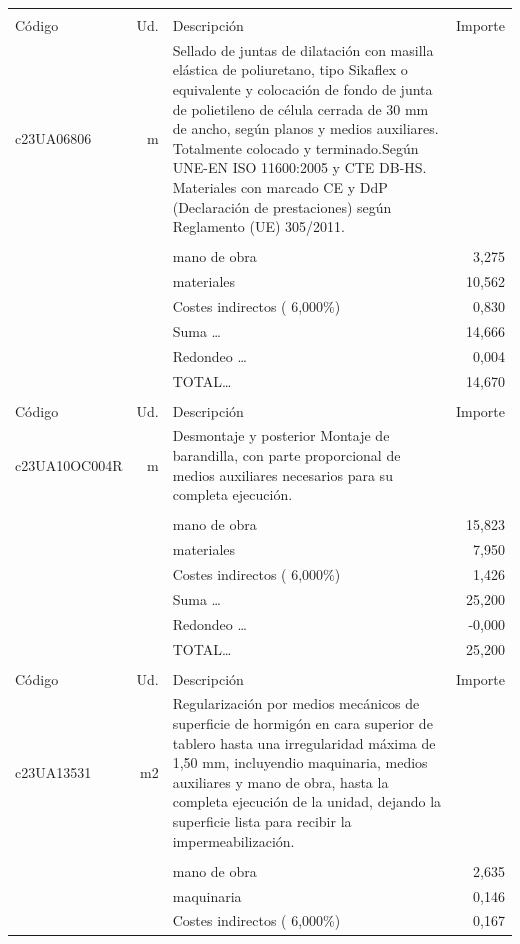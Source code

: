\begin{supertabular}{l r p{60mm} r}
&&&\\%
Código&Ud.&Descripción&Importe\\%
\hline%
c23UA06806&m&Sellado de juntas de dilatación con masilla elástica de poliuretano, tipo Sikaflex o equivalente y colocación de fondo de junta de polietileno de célula cerrada de 30 mm de ancho, según planos y medios auxiliares. Totalmente colocado y terminado.Según UNE{-}EN ISO 11600:2005 y CTE DB{-}HS. Materiales con marcado CE y DdP (Declaración de prestaciones) según Reglamento (UE) 305/2011.&\\%
&&&\\%
&&mano de obra&     3,275\\%
&&materiales&    10,562\\%
&&Costes indirectos (     6,000\%)&     0,830\\%
&&Suma \ldots&    14,666\\%
&&Redondeo \ldots&     0,004\\%
%
&&TOTAL\ldots&    14,670\\%
&&&\\%
Código&Ud.&Descripción&Importe\\%
\hline%
c23UA10OC004R&m&Desmontaje y posterior Montaje de barandilla, con parte proporcional de medios auxiliares necesarios para su completa ejecución.&\\%
&&&\\%
&&mano de obra&    15,823\\%
&&materiales&     7,950\\%
&&Costes indirectos (     6,000\%)&     1,426\\%
&&Suma \ldots&    25,200\\%
&&Redondeo \ldots&    {-}0,000\\%
%
&&TOTAL\ldots&    25,200\\%
&&&\\%
Código&Ud.&Descripción&Importe\\%
\hline%
c23UA13531&m2&Regularización por medios mecánicos de superficie de hormigón en cara superior de tablero hasta una irregularidad máxima de 1,50 mm, incluyendio maquinaria, medios auxiliares y mano de obra, hasta la completa ejecución de la unidad, dejando la superficie lista para recibir la impermeabilización.&\\%
&&&\\%
&&mano de obra&     2,635\\%
&&maquinaria&     0,146\\%
&&Costes indirectos (     6,000\%)&     0,167\\%

\end{supertabular}
